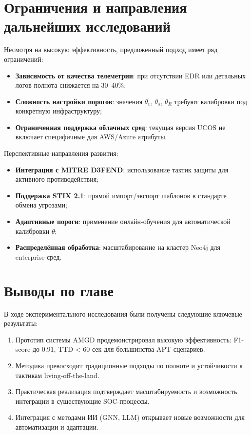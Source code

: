 \documentclass{article}
\begin{document}
\section{Ограничения и направления дальнейших исследований}\label{sec:ch4/sect7}

Несмотря на высокую эффективность, предложенный подход имеет ряд ограничений:

\begin{itemize}
    \item \textbf{Зависимость от качества телеметрии}: при отсутствии EDR или детальных логов полнота снижается на 30–40\%;
    \item \textbf{Сложность настройки порогов}: значения $\theta_v$, $\theta_s$, $\theta_R$ требуют калибровки под конкретную инфраструктуру;
    \item \textbf{Ограниченная поддержка облачных сред}: текущая версия UCOS не включает специфичные для AWS/Azure атрибуты.
\end{itemize}

Перспективные направления развития:

\begin{itemize}
    \item \textbf{Интеграция с MITRE D3FEND}: использование тактик защиты для активного противодействия;
    \item \textbf{Поддержка STIX 2.1}: прямой импорт/экспорт шаблонов в стандарте обмена угрозами;
    \item \textbf{Адаптивные пороги}: применение онлайн-обучения для автоматической калибровки $\theta$;
    \item \textbf{Распределённая обработка}: масштабирование на кластер Neo4j для enterprise-сред.
\end{itemize}

\section{Выводы по главе}\label{sec:ch4/conclusion}

В ходе экспериментального исследования были получены следующие ключевые результаты:
\begin{enumerate}
    \item Прототип системы AMGD продемонстрировал высокую эффективность: F1-score до 0.91, TTD < 60 сек для большинства APT-сценариев.
    \item Методика превосходит традиционные подходы по полноте и устойчивости к тактикам living-off-the-land.
    \item Практическая реализация подтверждает масштабируемость и возможность интеграции в существующие SOC-процессы.
    \item Интеграция с методами ИИ (GNN, LLM) открывает новые возможности для автоматизации и адаптации.
\end{enumerate}
\end{document}
